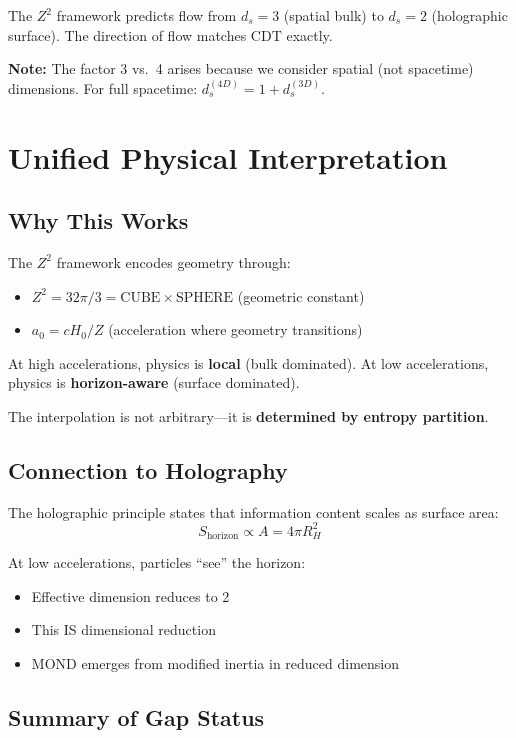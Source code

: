 \documentclass[11pt,a4paper]{article}
\theoremstyle{plain}
\theoremstyle{definition}
\theoremstyle{remark}
\newcommand{\CUBE}{\text{CUBE}}
\newcommand{\SPHERE}{\text{SPHERE}}
\begin{document}
The $Z^2$ framework predicts flow from $d_s = 3$ (spatial bulk) to $d_s = 2$ (holographic surface). The direction of flow matches CDT exactly.

\textbf{Note:} The factor 3 vs.\ 4 arises because we consider spatial (not spacetime) dimensions. For full spacetime: $d_s^{(4D)} = 1 + d_s^{(3D)}$.

\section{Unified Physical Interpretation}

\subsection{Why This Works}

The $Z^2$ framework encodes geometry through:
\begin{itemize}
  \item $Z^2 = 32\pi/3 = \CUBE \times \SPHERE$ (geometric constant)
  \item $a_0 = cH_0/Z$ (acceleration where geometry transitions)
\end{itemize}

At high accelerations, physics is \textbf{local} (bulk dominated).
At low accelerations, physics is \textbf{horizon-aware} (surface dominated).

The interpolation is not arbitrary---it is \textbf{determined by entropy partition}.

\subsection{Connection to Holography}

The holographic principle states that information content scales as surface area:
\[
S_{\text{horizon}} \propto A = 4\pi R_H^2
\]

At low accelerations, particles ``see'' the horizon:
\begin{itemize}
  \item Effective dimension reduces to 2
  \item This IS dimensional reduction
  \item MOND emerges from modified inertia in reduced dimension
\end{itemize}

\subsection{Summary of Gap Status}
\end{document}
